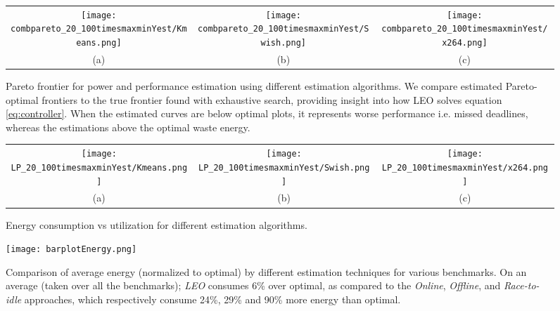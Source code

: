 \begin{figure*}
\begin{center}
\begin{tabular}[h]{ccc}\hspace*{-15pt}     
	\texttt{[image: combpareto\_20\_100timesmaxminYest/Kmeans.png]}&
	\texttt{[image: combpareto\_20\_100timesmaxminYest/Swish.png]}&
	\texttt{[image: combpareto\_20\_100timesmaxminYest/x264.png]}	\\
	{(a)} &
	{(b)} &
	{(c)}
\end{tabular}
\caption{Pareto frontier for power and performance
  estimation using different estimation algorithms. We compare estimated Pareto-optimal frontiers to the true frontier found with exhaustive search, providing insight into how LEO solves equation \eqref{eq:controller}. When the estimated curves are below optimal plots, it represents worse performance i.e. missed deadlines, whereas the estimations above the optimal waste energy.
}
\label{fig:pareto}
\begin{tabular}[h]{ccc}\hspace*{-15pt}     
	\texttt{[image: LP\_20\_100timesmaxminYest/Kmeans.png]}&
	\texttt{[image: LP\_20\_100timesmaxminYest/Swish.png]}&
	\texttt{[image: LP\_20\_100timesmaxminYest/x264.png]}\\
	{(a)} &
	{(b)} &
	{(c)}
\end{tabular}
\caption{Energy consumption vs utilization for different
  estimation algorithms.}
\label{fig:LP}
\end{center}
\end{figure*}


\begin{figure*}
\begin{center}
 \texttt{[image: barplotEnergy.png]}
 \caption{Comparison of average energy (normalized to
   optimal) by different estimation techniques for various benchmarks.
    On an average (taken over all the benchmarks);
   \textit{LEO} consumes 6\% over optimal, as compared to the
   \textit{Online}, \textit{Offline}, and \textit{Race-to-idle}
   approaches, which respectively consume 24\%, 29\% and 90\% more
   energy than optimal. }
\label{fig:barEnergy}
\end{center}
\end{figure*}



